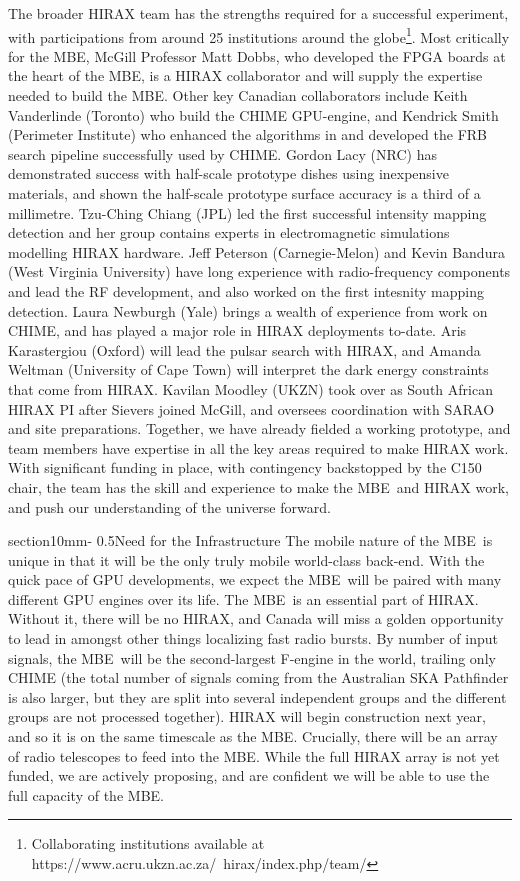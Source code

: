 \documentclass[letterpaper,11pt,preprint]{aastex}
\makeatletter
\newcommand{\mbe}{{\rm MBE}}
\renewcommand{\section}{\@startsection%
{section}{1}{0mm}{-\baselineskip}%
{0.5\baselineskip}{\normalfont\Large\bfseries}}%
\makeatother
\begin{document}
The broader HIRAX team has the strengths required for a successful
experiment, with participations from around 25 institutions around the
globe\footnote{Collaborating institutions available at
  https://www.acru.ukzn.ac.za/~hirax/index.php/team/}.  Most
critically for the \mbe, McGill Professor Matt Dobbs, who developed
the FPGA boards at the heart of the \mbe, is a HIRAX collaborator and
will supply the expertise needed to build the \mbe.  Other key
Canadian collaborators include Keith Vanderlinde (Toronto) who build
the CHIME GPU-engine, and Kendrick Smith (Perimeter Institute) who
enhanced the algorithms in \citet{Masui15} and developed the FRB
search pipeline successfully used by CHIME. Gordon Lacy (NRC) has
demonstrated success with half-scale prototype dishes using
inexpensive materials, and shown the half-scale prototype surface
accuracy is a third of a millimetre.  Tzu-Ching Chiang (JPL) led
the first successful intensity mapping detection \citep{Chang10} and
her group contains experts in electromagnetic simulations modelling
HIRAX hardware.  Jeff Peterson (Carnegie-Melon) and Kevin Bandura
(West Virginia University) have long experience with radio-frequency
components and lead the RF development, and also worked on the first
intesnity mapping detection.  Laura Newburgh (Yale) brings a wealth of
experience from work on CHIME, and has played a major role in HIRAX
deployments to-date.  Aris Karastergiou (Oxford) will lead the pulsar
search with HIRAX, and Amanda Weltman (University of Cape Town) will
interpret the dark energy constraints that come from HIRAX.  Kavilan
Moodley (UKZN) took over as South African HIRAX PI after Sievers
joined McGill, and oversees coordination with SARAO and site
preparations.  Together, we have already fielded a working prototype,
and team members have expertise in all the key areas required to make
HIRAX work.  With significant funding in place, with contingency
backstopped by the C150 chair, the team has the skill and experience
to make the \mbe\ and HIRAX work, and push our understanding of the
universe forward.

\section{Need for the Infrastructure}
The mobile nature of the \mbe\ is unique in that it will be the only
truly mobile world-class back-end.  With the quick pace of GPU
developments, we expect the \mbe\ will be paired with many different
GPU engines over its life.  The \mbe\ is an essential part of HIRAX.
Without it, there will be no HIRAX, and Canada will miss a golden
opportunity to lead in amongst other things localizing fast radio
bursts.  By number of input signals, the \mbe\ will be the
second-largest F-engine in the world, trailing only CHIME (the total
number of signals coming from the Australian SKA Pathfinder is also larger,
but they are split into several independent groups and the different
groups are not processed together).  HIRAX will begin construction
next year, and so it is on the same timescale as the \mbe.  Crucially,
there will be an array of radio telescopes to feed into the \mbe.
While the full HIRAX array is not yet funded, we are actively
proposing, and are confident we will be able to use the full capacity
of the \mbe.  
\end{document}
